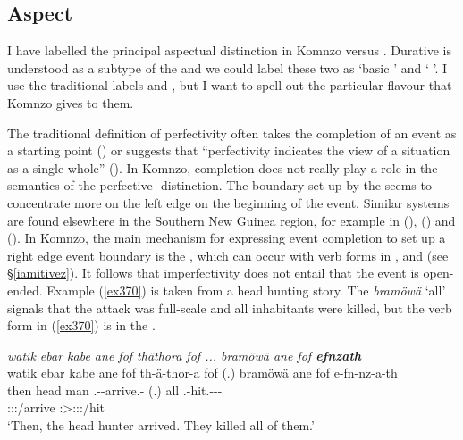 \subsection{Aspect}\label{TAMsemaspect}

I have labelled the principal aspectual distinction in Komnzo  versus . Durative  is understood as a subtype of the  and we could label these two as `basic ' and ` '. I use the traditional labels  and , but I want to spell out the particular flavour that Komnzo gives to them.%

The traditional definition of perfectivity often takes the completion of an event as a starting point (\citealt[296]{Frawley:1992wi}) or suggests that ``perfectivity indicates the view of a situation as a single whole'' (\citealt[16]{Comrie:1976vd}). In Komnzo, completion does not really play a role in the semantics of the perfective- distinction. The boundary set up by the  seems to concentrate more on the left edge \textendash{} on the beginning of the event. Similar systems are found elsewhere in the Southern New Guinea region, for example in  (\citealt[41]{Drabbe:1955tm}),  (\citealt{Siegel:2015bp}) and  (\citealt{Evans:2015wy}). In Komnzo, the main mechanism for expressing event completion \textendash{} to set up a right edge event boundary \textendash{} is the  , which can occur with verb forms in ,  and   (see \S{}\ref{iamitivez}). It follows that imperfectivity does not entail that the event is open-ended. Example (\ref{ex370}) is taken from a head hunting story. The  \emph{bramöwä} `all' signals that the attack was full-scale and all inhabitants were killed, but the verb form in (\ref{ex370}) is in the .

\begin{exe}
	\ex \emph{watik ebar kabe ane fof thäthora fof ... bramöwä ane fof \textbf{efnzath}}\\
	\glll watik ebar kabe ane fof th-ä-thor-a fof (.) bramöwä ane fof e-fn-nz-a-th\\
	then head man \Dem{} \Emph{} \Stnsg.\Gam-\Ndu-arrive.\Rs-\Pst{} \Emph{} (.) all \Dem{} \Emph{} \Stnsg.\Alph-hit.\Ext-\Ndu-\Pst-\Stnsg{}\\
	{} {} {} {} {} \footnotesize{\Stpl:\Sbj:\Pst:\Pfv/arrive} {} {} {} {} {} \footnotesize{\Stpl:\Sbj>\Stpl:\Obj:\Pst:\Ipfv/hit}\\
	\trans `Then, the head hunter arrived. They killed all of them.'\\
	\label{ex370}
\end{exe}

